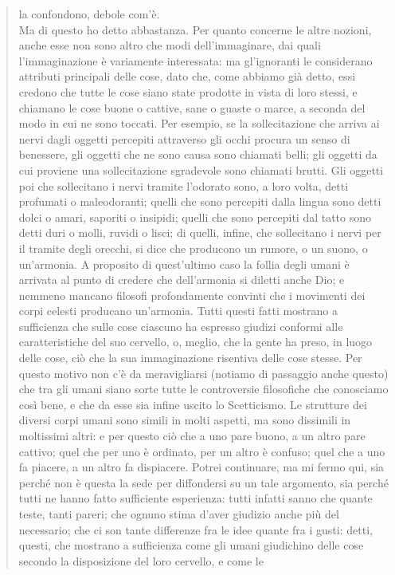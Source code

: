 \begin{quotation}
	la confondono, debole com’è.\\
	Ma di questo ho detto abbastanza. Per quanto concerne le altre nozioni, anche esse non sono altro che modi dell’immaginare, dai quali l’immaginazione
	è variamente interessata: ma gl’ignoranti le considerano attributi principali delle cose, dato
	che, come abbiamo già detto, essi credono che tutte le cose siano state prodotte in vista di
	loro stessi, e chiamano le cose buone o cattive, sane o guaste o marce, a seconda del modo
	in cui ne sono toccati. Per esempio, se la sollecitazione che arriva ai nervi dagli oggetti percepiti attraverso gli occhi procura un senso di benessere, gli oggetti che ne sono causa sono
	chiamati belli; gli oggetti da cui proviene una sollecitazione sgradevole sono chiamati brutti. Gli oggetti poi che sollecitano i nervi tramite l’odorato sono, a loro volta, detti profumati
	o maleodoranti; quelli che sono percepiti dalla lingua sono detti dolci o amari, saporiti o insipidi; quelli che sono percepiti dal tatto sono detti duri o molli, ruvidi o lisci; di quelli, infine, che sollecitano i nervi per il tramite degli orecchi, si dice che producono un rumore, o
	un suono, o un’armonia. A proposito di quest’ultimo caso la follia degli umani è arrivata al
	punto di credere che dell’armonia si diletti anche Dio; e nemmeno mancano filosofi profondamente convinti che i movimenti dei corpi celesti producano un’armonia. Tutti questi fatti mostrano a sufficienza che sulle cose ciascuno ha espresso giudizi conformi alle caratteristiche del suo cervello, o, meglio, che la gente ha preso, in luogo delle cose, ciò che la sua
	immaginazione risentiva delle cose stesse. Per questo motivo non c’è da meravigliarsi (notiamo di passaggio anche questo) che tra gli umani siano sorte tutte le controversie filosofiche che conosciamo così bene, e che da esse sia infine uscito lo Scetticismo. Le strutture dei diversi corpi umani sono simili in molti aspetti, ma sono dissimili in moltissimi altri: e per questo ciò che a uno pare buono, a un altro pare cattivo; quel che per uno è
	ordinato, per un altro è confuso; quel che a uno fa piacere, a un altro fa dispiacere. Potrei
	continuare, ma mi fermo qui, sia perché non è questa la sede per diffondersi su un tale argomento, sia perché tutti ne hanno fatto sufficiente esperienza: tutti infatti sanno che
	quante teste, tanti pareri; che ognuno stima d’aver giudizio anche più del necessario; che
	ci son tante differenze fra le idee quante fra i gusti: detti, questi, che mostrano a sufficienza come gli umani giudichino delle cose secondo la disposizione del loro cervello, e come le

\end{quotation}
